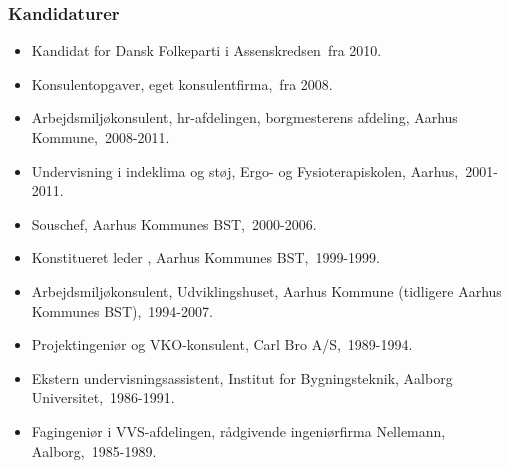 \documentclass[11pt, a4paper]{awesome-cv}
\begin{document}
\begin{cvletter}
\subsubsection*{Kandidaturer}
\begin{itemize}
\item Kandidat for Dansk Folkeparti i Assenskredsen fra 2010.
\end{itemize}
\begin{itemize}
\item Konsulentopgaver, eget konsulentfirma, fra 2008.
\item Arbejdsmiljøkonsulent, hr-afdelingen, borgmesterens afdeling, Aarhus Kommune, 2008-2011.
\item Undervisning i indeklima og støj, Ergo- og Fysioterapiskolen, Aarhus, 2001-2011.
\item Souschef, Aarhus Kommunes BST, 2000-2006.
\item Konstitueret leder , Aarhus Kommunes BST, 1999-1999.
\item Arbejdsmiljøkonsulent, Udviklingshuset, Aarhus Kommune (tidligere Aarhus Kommunes BST), 1994-2007.
\item Projektingeniør og VKO-konsulent, Carl Bro A/S, 1989-1994.
\item Ekstern undervisningsassistent, Institut for Bygningsteknik, Aalborg Universitet, 1986-1991.
\item Fagingeniør i VVS-afdelingen, rådgivende ingeniørfirma Nellemann, Aalborg, 1985-1989.
\end{itemize}
\end{cvletter}
\end{document}
